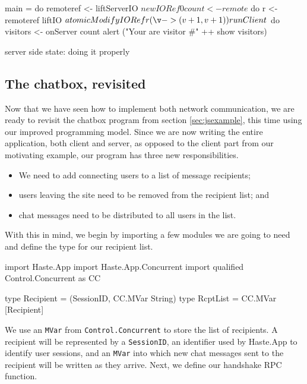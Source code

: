 \documentclass[preprint]{sigplanconf}
\begin{document}
\begin{listingfloat}
\begin{code}
main = do
  remoteref <- liftServerIO $ newIORef 0

  count <- remote $ do
    r <- remoteref
    liftIO $ atomicModifyIORef r (\v -> (v+1, v+1))

  runClient $ do
    visitors <- onServer count
    alert ("Your are visitor #" ++ show visitors)
\end{code}
\caption{server side state: doing it properly}
\label{lst:good-state}
\end{listingfloat}

\subsection{The chatbox, revisited}\label{sec:chatboxrevisited}

Now that we have seen how to implement both network communication, we are ready
to revisit the chatbox program from section \ref{sec:jsexample}, this time
using our improved programming model. Since we are now writing the entire
application, both client and server, as opposed to the client part from our
motivating example, our program has three new responsibilities.

\begin{itemize}
  \item We need to add connecting users to a list of message recipients;
  \item users leaving the site need to be removed from the recipient list; and
  \item chat messages need to be distributed to all users in the list.
\end{itemize}

With this in mind, we begin by importing a few modules we are going to need and
define the type for our recipient list.

\begin{code}
import Haste.App
import Haste.App.Concurrent
import qualified Control.Concurrent as CC

type Recipient = (SessionID, CC.MVar String)
type RcptList = CC.MVar [Recipient]
\end{code}

We use an \lstinline!MVar! from \lstinline!Control.Concurrent! to store the
list of recipients. A recipient will be represented by a \lstinline!SessionID!,
an identifier used by Haste.App to identify user sessions, and an
\lstinline!MVar! into which new chat messages sent to the recipient will be
written as they arrive. Next, we define our handshake RPC function.
\end{document}
